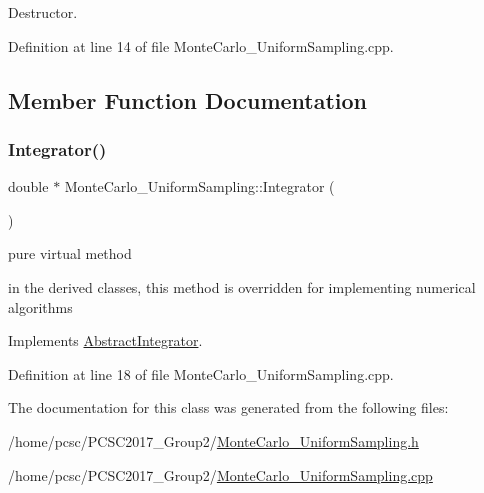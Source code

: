 Destructor. 



Definition at line 14 of file Monte\+Carlo\+\_\+\+Uniform\+Sampling.\+cpp.



\subsection{Member Function Documentation}
\mbox{\label{class_monte_carlo___uniform_sampling_a1920387a9f817c8179531fa02f7c00d3}} 
\subsubsection{\texorpdfstring{Integrator()}{Integrator()}}
{\footnotesize\ttfamily double $\ast$ Monte\+Carlo\+\_\+\+Uniform\+Sampling\+::\+Integrator (\begin{DoxyParamCaption}{ }\end{DoxyParamCaption})\hspace{0.3cm}{\ttfamily [virtual]}}



pure virtual method 

in the derived classes, this method is overridden for implementing numerical algorithms 

Implements \hyperlink{class_abstract_integrator_a073d8f87239f732b3d2832070caa3b17}{Abstract\+Integrator}.



Definition at line 18 of file Monte\+Carlo\+\_\+\+Uniform\+Sampling.\+cpp.



The documentation for this class was generated from the following files\+:\begin{DoxyCompactItemize}
\item 
/home/pcsc/\+P\+C\+S\+C2017\+\_\+\+Group2/\hyperlink{_monte_carlo___uniform_sampling_8h}{Monte\+Carlo\+\_\+\+Uniform\+Sampling.\+h}\item 
/home/pcsc/\+P\+C\+S\+C2017\+\_\+\+Group2/\hyperlink{_monte_carlo___uniform_sampling_8cpp}{Monte\+Carlo\+\_\+\+Uniform\+Sampling.\+cpp}\end{DoxyCompactItemize}
